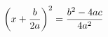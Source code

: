 \documentclass[preview]{standalone}
\begin{document}
\begin{align*}
\left( x + { b \over 2 a } \right) ^2 = { b ^2 - 4 a c \over 4 a ^2 }
\end{align*}
\end{document}
